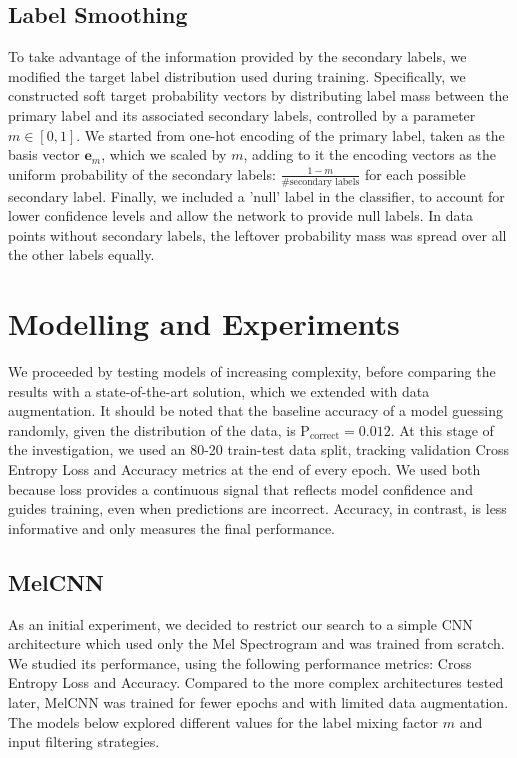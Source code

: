\documentclass[11pt]{article}
\begin{document}
\subsection*{Label Smoothing}

To take advantage of the information provided by the secondary labels, we modified the target label distribution used during training. Specifically, we constructed soft target probability vectors by distributing label mass between the primary label and its associated secondary labels, controlled by a parameter $m \in [0,1]$. We started from one-hot encoding of the primary label, taken as the basis vector $\mathbf{e}_m$, which we scaled by $m$, adding to it the encoding vectors as the uniform probability of the secondary labels: $\frac{1-m}{\#\text{secondary labels}}$ for each possible secondary label. Finally, we included a 'null' label in the classifier, to account for lower confidence levels and allow the network to provide null labels. In data points without secondary labels, the leftover probability mass was spread over all the other labels equally.

\section*{Modelling and Experiments}

We proceeded by testing models of increasing complexity, before comparing the results with a state-of-the-art solution, which we extended with data augmentation. It should be noted that the baseline accuracy of a model guessing randomly, given the distribution of the data, is $\text{P}_\text{correct} = 0.012$. At this stage of the investigation, we used an 80-20 train-test data split, tracking validation Cross Entropy Loss and Accuracy metrics at the end of every epoch. We used both because loss provides a continuous signal that reflects model confidence and guides training, even when predictions are incorrect. Accuracy, in contrast, is less informative and only measures the final performance.

\subsection*{MelCNN}

As an initial experiment, we decided to restrict our search to a simple CNN architecture which used only the Mel Spectrogram and was trained from scratch. We studied its performance, using the following performance metrics: Cross Entropy Loss and Accuracy. Compared to the more complex architectures tested later, MelCNN was trained for fewer epochs and with limited data augmentation. The models below explored different values for the label mixing factor $m$ and input filtering strategies.
\end{document}
